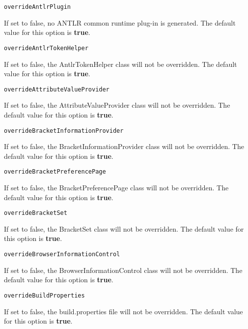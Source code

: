 \noindent\texttt{overrideAntlrPlugin}
\begin{myindentpar}{1cm}
If set to false, no ANTLR common runtime plug-in is generated. The default value for this option is \textbf{true}.
\end{myindentpar}

\noindent\texttt{overrideAntlrTokenHelper}
\begin{myindentpar}{1cm}
If set to false, the AntlrTokenHelper class will not be overridden. The default value for this option is \textbf{true}.
\end{myindentpar}

\noindent\texttt{overrideAttributeValueProvider}
\begin{myindentpar}{1cm}
If set to false, the AttributeValueProvider class will not be overridden. The default value for this option is \textbf{true}.
\end{myindentpar}

\noindent\texttt{overrideBracketInformationProvider}
\begin{myindentpar}{1cm}
If set to false, the BracketInformationProvider class will not be overridden. The default value for this option is \textbf{true}.
\end{myindentpar}

\noindent\texttt{overrideBracketPreferencePage}
\begin{myindentpar}{1cm}
If set to false, the BracketPreferencePage class will not be overridden. The default value for this option is \textbf{true}.
\end{myindentpar}

\noindent\texttt{overrideBracketSet}
\begin{myindentpar}{1cm}
If set to false, the BracketSet class will not be overridden. The default value for this option is \textbf{true}.
\end{myindentpar}

\noindent\texttt{overrideBrowserInformationControl}
\begin{myindentpar}{1cm}
If set to false, the BrowserInformationControl class will not be overridden. The default value for this option is \textbf{true}.
\end{myindentpar}

\noindent\texttt{overrideBuildProperties}
\begin{myindentpar}{1cm}
If set to false, the build.properties file will not be overridden. The default value for this option is \textbf{true}.
\end{myindentpar}

